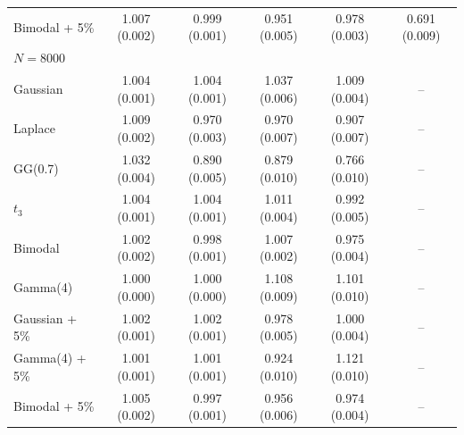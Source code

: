 \begin{tabular}{lccccc}
Bimodal + 5\% & 1.007 (0.002) & 0.999 (0.001) & 0.951 (0.005) & 0.978 (0.003) & 0.691 (0.009) \\
\multicolumn{6}{l}{\emph{$N=8000$}} \\
Gaussian & 1.004 (0.001) & 1.004 (0.001) & 1.037 (0.006) & 1.009 (0.004) & -- \\
Laplace & 1.009 (0.002) & 0.970 (0.003) & 0.970 (0.007) & 0.907 (0.007) & -- \\
GG(0.7) & 1.032 (0.004) & 0.890 (0.005) & 0.879 (0.010) & 0.766 (0.010) & -- \\
$t_3$ & 1.004 (0.001) & 1.004 (0.001) & 1.011 (0.004) & 0.992 (0.005) & -- \\
Bimodal & 1.002 (0.002) & 0.998 (0.001) & 1.007 (0.002) & 0.975 (0.004) & -- \\
Gamma(4) & 1.000 (0.000) & 1.000 (0.000) & 1.108 (0.009) & 1.101 (0.010) & -- \\
Gaussian + 5\% & 1.002 (0.001) & 1.002 (0.001) & 0.978 (0.005) & 1.000 (0.004) & -- \\
Gamma(4) + 5\% & 1.001 (0.001) & 1.001 (0.001) & 0.924 (0.010) & 1.121 (0.010) & -- \\
Bimodal + 5\% & 1.005 (0.002) & 0.997 (0.001) & 0.956 (0.006) & 0.974 (0.004) & -- \\
\bottomrule
\end{tabular}
